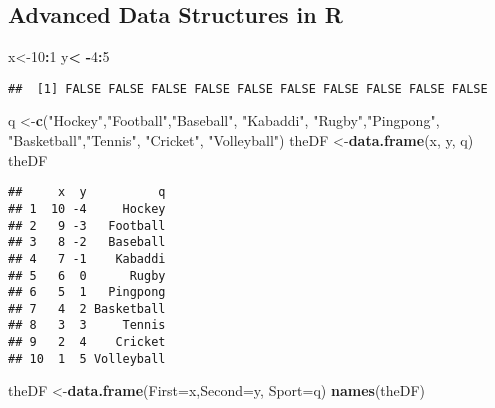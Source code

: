 \documentclass[
]{article}
\newenvironment{Shaded}{\begin{snugshade}}{\end{snugshade}}
\newcommand{\AttributeTok}[1]{\textcolor[rgb]{0.13,0.29,0.53}{#1}}
\newcommand{\DecValTok}[1]{\textcolor[rgb]{0.00,0.00,0.81}{#1}}
\newcommand{\FunctionTok}[1]{\textcolor[rgb]{0.13,0.29,0.53}{\textbf{#1}}}
\newcommand{\NormalTok}[1]{#1}
\newcommand{\OtherTok}[1]{\textcolor[rgb]{0.56,0.35,0.01}{#1}}
\newcommand{\SpecialCharTok}[1]{\textcolor[rgb]{0.81,0.36,0.00}{\textbf{#1}}}
\newcommand{\StringTok}[1]{\textcolor[rgb]{0.31,0.60,0.02}{#1}}
\begin{document}
\subsection{Advanced Data Structures in
R}\label{advanced-data-structures-in-r}

\begin{Shaded}
\begin{Highlighting}[]
\NormalTok{x}\OtherTok{\textless{}{-}}\DecValTok{10}\SpecialCharTok{:}\DecValTok{1}
\NormalTok{y}\SpecialCharTok{\textless{}} \SpecialCharTok{{-}}\DecValTok{4}\SpecialCharTok{:}\DecValTok{5}
\end{Highlighting}
\end{Shaded}

\begin{verbatim}
##  [1] FALSE FALSE FALSE FALSE FALSE FALSE FALSE FALSE FALSE FALSE
\end{verbatim}

\begin{Shaded}
\begin{Highlighting}[]
\NormalTok{q }\OtherTok{\textless{}{-}}\FunctionTok{c}\NormalTok{(}\StringTok{"Hockey"}\NormalTok{,}\StringTok{"Football"}\NormalTok{,}\StringTok{"Baseball"}\NormalTok{, }\StringTok{"Kabaddi"}\NormalTok{, }\StringTok{"Rugby"}\NormalTok{,}\StringTok{"Pingpong"}\NormalTok{, }\StringTok{"Basketball"}\NormalTok{,}\StringTok{"Tennis"}\NormalTok{, }\StringTok{"Cricket"}\NormalTok{, }\StringTok{"Volleyball"}\NormalTok{)}
\NormalTok{theDF }\OtherTok{\textless{}{-}}\FunctionTok{data.frame}\NormalTok{(x, y, q)}
\NormalTok{theDF}
\end{Highlighting}
\end{Shaded}

\begin{verbatim}
##     x  y          q
## 1  10 -4     Hockey
## 2   9 -3   Football
## 3   8 -2   Baseball
## 4   7 -1    Kabaddi
## 5   6  0      Rugby
## 6   5  1   Pingpong
## 7   4  2 Basketball
## 8   3  3     Tennis
## 9   2  4    Cricket
## 10  1  5 Volleyball
\end{verbatim}

\begin{Shaded}
\begin{Highlighting}[]
\NormalTok{theDF }\OtherTok{\textless{}{-}}\FunctionTok{data.frame}\NormalTok{(}\AttributeTok{First=}\NormalTok{x,}\AttributeTok{Second=}\NormalTok{y, }\AttributeTok{Sport=}\NormalTok{q)}
\FunctionTok{names}\NormalTok{(theDF)}
\end{Highlighting}
\end{Shaded}
\end{document}
